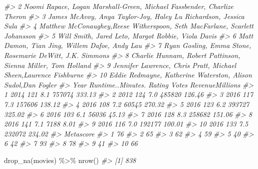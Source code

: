 \documentclass[
]{book}
\newenvironment{Shaded}{\begin{snugshade}}{\end{snugshade}}
\newcommand{\CommentTok}[1]{\textcolor[rgb]{0.56,0.35,0.01}{\textit{#1}}}
\newcommand{\FunctionTok}[1]{\textcolor[rgb]{0.00,0.00,0.00}{#1}}
\newcommand{\NormalTok}[1]{#1}
\newcommand{\SpecialCharTok}[1]{\textcolor[rgb]{0.00,0.00,0.00}{#1}}
\begin{document}
\begin{Shaded}
\begin{Highlighting}[]
\CommentTok{\#\textgreater{} 2     Noomi Rapace, Logan Marshall{-}Green, Michael Fassbender, Charlize Theron}
\CommentTok{\#\textgreater{} 3            James McAvoy, Anya Taylor{-}Joy, Haley Lu Richardson, Jessica Sula}
\CommentTok{\#\textgreater{} 4  Matthew McConaughey,Reese Witherspoon, Seth MacFarlane, Scarlett Johansson}
\CommentTok{\#\textgreater{} 5                          Will Smith, Jared Leto, Margot Robbie, Viola Davis}
\CommentTok{\#\textgreater{} 6                               Matt Damon, Tian Jing, Willem Dafoe, Andy Lau}
\CommentTok{\#\textgreater{} 7                    Ryan Gosling, Emma Stone, Rosemarie DeWitt, J.K. Simmons}
\CommentTok{\#\textgreater{} 8                Charlie Hunnam, Robert Pattinson, Sienna Miller, Tom Holland}
\CommentTok{\#\textgreater{} 9            Jennifer Lawrence, Chris Pratt, Michael Sheen,Laurence Fishburne}
\CommentTok{\#\textgreater{} 10               Eddie Redmayne, Katherine Waterston, Alison Sudol,Dan Fogler}
\CommentTok{\#\textgreater{}    Year Runtime..Minutes. Rating  Votes RevenueMillions}
\CommentTok{\#\textgreater{} 1  2014               121    8.1 757074          333.13}
\CommentTok{\#\textgreater{} 2  2012               124    7.0 485820          126.46}
\CommentTok{\#\textgreater{} 3  2016               117    7.3 157606          138.12}
\CommentTok{\#\textgreater{} 4  2016               108    7.2  60545          270.32}
\CommentTok{\#\textgreater{} 5  2016               123    6.2 393727          325.02}
\CommentTok{\#\textgreater{} 6  2016               103    6.1  56036           45.13}
\CommentTok{\#\textgreater{} 7  2016               128    8.3 258682          151.06}
\CommentTok{\#\textgreater{} 8  2016               141    7.1   7188            8.01}
\CommentTok{\#\textgreater{} 9  2016               116    7.0 192177          100.01}
\CommentTok{\#\textgreater{} 10 2016               133    7.5 232072          234.02}
\CommentTok{\#\textgreater{}    Metascore}
\CommentTok{\#\textgreater{} 1         76}
\CommentTok{\#\textgreater{} 2         65}
\CommentTok{\#\textgreater{} 3         62}
\CommentTok{\#\textgreater{} 4         59}
\CommentTok{\#\textgreater{} 5         40}
\CommentTok{\#\textgreater{} 6         42}
\CommentTok{\#\textgreater{} 7         93}
\CommentTok{\#\textgreater{} 8         78}
\CommentTok{\#\textgreater{} 9         41}
\CommentTok{\#\textgreater{} 10        66}

\FunctionTok{drop\_na}\NormalTok{(movies) }\SpecialCharTok{\%\textgreater{}\%}
\FunctionTok{nrow}\NormalTok{()}
\CommentTok{\#\textgreater{} [1] 838}
\end{Highlighting}
\end{Shaded}
\end{document}
